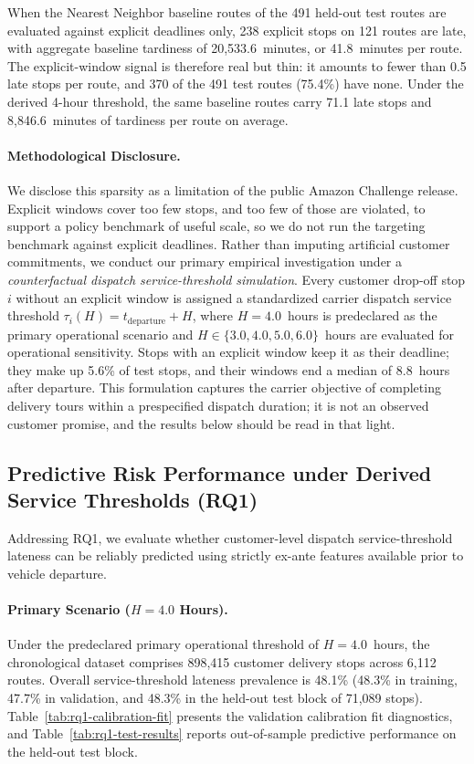 \documentclass[11pt,a4paper]{article}
\begin{document}
When the Nearest Neighbor baseline routes of the 491 held-out test routes are evaluated against explicit deadlines only, 238 explicit stops on 121 routes are late, with aggregate baseline tardiness of 20,533.6~minutes, or 41.8~minutes per route. The explicit-window signal is therefore real but thin: it amounts to fewer than 0.5 late stops per route, and 370 of the 491 test routes (75.4\%) have none. Under the derived 4-hour threshold, the same baseline routes carry 71.1 late stops and 8,846.6~minutes of tardiness per route on average.

\paragraph{Methodological Disclosure.}
We disclose this sparsity as a limitation of the public Amazon Challenge release. Explicit windows cover too few stops, and too few of those are violated, to support a policy benchmark of useful scale, so we do not run the targeting benchmark against explicit deadlines. Rather than imputing artificial customer commitments, we conduct our primary empirical investigation under a \emph{counterfactual dispatch service-threshold simulation}. Every customer drop-off stop $i$ without an explicit window is assigned a standardized carrier dispatch service threshold $\tau_i(H) = t_{\text{departure}} + H$, where $H = 4.0$~hours is predeclared as the primary operational scenario and $H \in \{3.0, 4.0, 5.0, 6.0\}$~hours are evaluated for operational sensitivity. Stops with an explicit window keep it as their deadline; they make up 5.6\% of test stops, and their windows end a median of 8.8~hours after departure. This formulation captures the carrier objective of completing delivery tours within a prespecified dispatch duration; it is not an observed customer promise, and the results below should be read in that light.

\subsection{Predictive Risk Performance under Derived Service Thresholds (RQ1)}\label{sec:res-rq1}

Addressing RQ1, we evaluate whether customer-level dispatch service-threshold lateness can be reliably predicted using strictly ex-ante features available prior to vehicle departure.

\paragraph{Primary Scenario ($H = 4.0$ Hours).}
Under the predeclared primary operational threshold of $H = 4.0$~hours, the chronological dataset comprises 898,415 customer delivery stops across 6,112 routes. Overall service-threshold lateness prevalence is 48.1\% (48.3\% in training, 47.7\% in validation, and 48.3\% in the held-out test block of 71,089 stops). Table~\ref{tab:rq1-calibration-fit} presents the validation calibration fit diagnostics, and Table~\ref{tab:rq1-test-results} reports out-of-sample predictive performance on the held-out test block.
\end{document}
